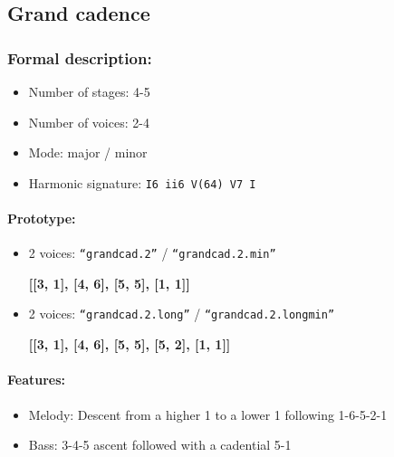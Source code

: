\documentclass[11pt, openany]{article}
\begin{document}
	\subsection{Grand cadence}
	
\subsubsection{Formal description:}
\begin{itemize}
\item Number of stages: 4-5
\item Number of voices: 2-4
\item Mode: major / minor
\item Harmonic signature: \texttt{I6 ii6 V(64) V7 I}
\end{itemize}

\paragraph{Prototype:}
\begin{itemize}
\item 2 voices: \texttt{“grandcad.2”} / \texttt{“grandcad.2.min”}
	\begin{center}
	\textbf{[[3, 1], [4, 6], [5, 5], [1, 1]]}
	\end{center}
\item 2 voices: \texttt{“grandcad.2.long”} / \texttt{“grandcad.2.longmin”}
	\begin{center}
	\textbf{[[3, 1], [4, 6], [5, 5], [5, 2], [1, 1]]}
	\end{center}
\end{itemize}

\paragraph{Features:}
\begin{itemize}
\item Melody: Descent from a higher 1 to a lower 1 following 1-6-5-2-1
\item Bass: 3-4-5 ascent followed with a cadential 5-1
\end{itemize}
\end{document}
